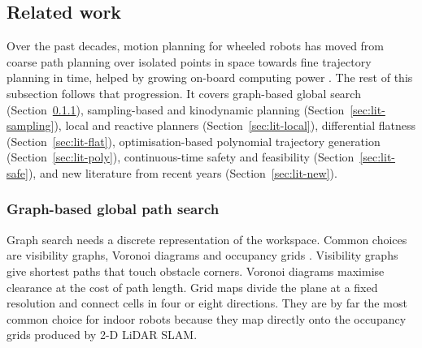 \documentclass[11pt,a4paper]{article}
\begin{document}
\subsection{Related work}
\label{sec:lit}

Over the past decades, motion planning for wheeled robots has moved from
coarse path planning over isolated points in space towards fine trajectory
planning in time, helped by growing on-board computing power
\citep{luo2024otpwr,gonzalez2016review}. The rest of this
subsection follows that progression. It covers graph-based global search
(Section~\ref{sec:lit-graph}), sampling-based and kinodynamic planning
(Section~\ref{sec:lit-sampling}), local and reactive planners
(Section~\ref{sec:lit-local}), differential flatness
(Section~\ref{sec:lit-flat}), optimisation-based polynomial trajectory
generation (Section~\ref{sec:lit-poly}), continuous-time safety and
feasibility (Section~\ref{sec:lit-safe}), and new literature from recent
years (Section~\ref{sec:lit-new}).

\subsubsection{Graph-based global path search}
\label{sec:lit-graph}

Graph search needs a discrete representation of the workspace. Common choices
are visibility graphs, Voronoi diagrams and occupancy grids
\citep{lavalle2006planning}. Visibility graphs give shortest paths that touch
obstacle corners. Voronoi diagrams maximise clearance at the cost of path
length. Grid maps divide the plane at a fixed resolution and connect cells in
four or eight directions. They are by far the most common choice for indoor
robots because they map directly onto the occupancy grids produced by 2-D
LiDAR SLAM.
\end{document}
